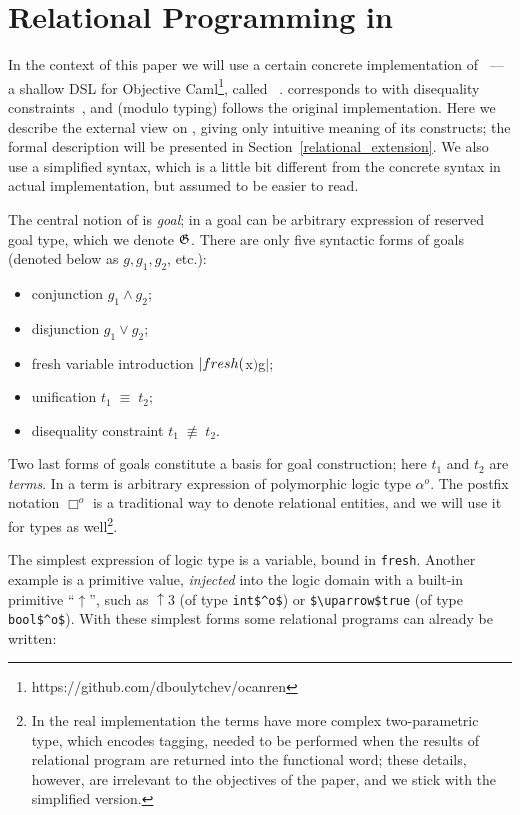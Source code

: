 \section{Relational Programming in \miniKanren}
\label{ocanren}

In the context of this paper we will use a certain concrete implementation of \miniKanren~--- a shallow DSL for Objective 
Caml\footnote{https://github.com/dboulytchev/ocanren}, called \ocanren~\cite{ocanren}. \ocanren corresponds to \miniKanren with
disequality constraints~\cite{CKanren}, and (modulo typing) follows the original implementation. Here we describe the external view 
on \ocanren, giving only intuitive meaning of its constructs; the formal description will be presented in Section~\ref{relational_extension}.
We also use a simplified syntax, which is a little bit different from the concrete syntax in actual implementation, but assumed to
be easier to read.

The central notion of \miniKanren is \emph{goal}; in \ocanren a goal can be arbitrary expression of reserved goal type, which we denote $\mathfrak G$.
There are only five syntactic forms of goals (denoted below as $g, g_1, g_2$, etc.):

\begin{itemize}
  \item conjunction $g_1\wedge g_2$;
  \item disjunction $g_1\vee g_2$;
  \item fresh variable introduction $\lstinline|fresh ($x$) $\;g$|$;
  \item unification $t_1\;\equiv\;t_2$;
  \item disequality constraint $t_1\;\not\equiv\;t_2$.
\end{itemize}

Two last forms of goals constitute a basis for goal construction; here $t_1$ and $t_2$ are \emph{terms}. In \ocanren a term is arbitrary expression of polymorphic logic type $\alpha^o$. The postfix notation $\Box^o$ is a traditional way to denote relational entities, and we will use it for types as well\footnote{In the real implementation the terms have more complex two-parametric type, which encodes tagging, needed to be performed when the results of relational program are returned into the functional word; these details, however, are irrelevant to the objectives of the paper, and we stick with the simplified version.}.

The simplest expression of logic type is a variable, bound in \lstinline|fresh|. Another example is a primitive value, \emph{injected} into the logic domain with a built-in primitive ``$\uparrow$'', such as $\uparrow\!3$ (of type \lstinline|int$^o$|) or \lstinline|$\uparrow$true| (of type \lstinline|bool$^o$|). With these simplest forms some relational programs can already be written:

